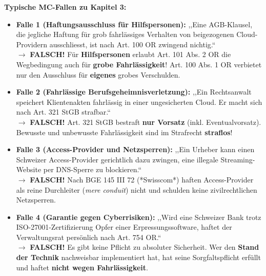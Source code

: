 \begin{important}
    \textbf{Typische MC-Fallen zu Kapitel 3:}
    \begin{itemize}
        \item \textbf{Falle 1 (Haftungsausschluss für Hilfspersonen):} ,,Eine AGB-Klausel, die jegliche Haftung für grob fahrlässiges Verhalten von beigezogenen Cloud-Providern ausschliesst, ist nach Art. 100 OR zwingend nichtig.`` \\
        $\rightarrow$ \textbf{FALSCH!} Für \textbf{Hilfspersonen} erlaubt Art. 101 Abs. 2 OR die Wegbedingung auch für \textbf{grobe Fahrlässigkeit}! Art. 100 Abs. 1 OR verbietet nur den Ausschluss für \textbf{eigenes} grobes Verschulden.
        \item \textbf{Falle 2 (Fahrlässige Berufsgeheimnisverletzung):} ,,Ein Rechtsanwalt speichert Klientenakten fahrlässig in einer ungesicherten Cloud. Er macht sich nach Art. 321 StGB strafbar.`` \\
        $\rightarrow$ \textbf{FALSCH!} Art. 321 StGB bestraft \textbf{nur Vorsatz} (inkl. Eventualvorsatz). Bewusste und unbewusste Fahrlässigkeit sind im Strafrecht \textbf{straflos}!
        \item \textbf{Falle 3 (Access-Provider und Netzsperren):} ,,Ein Urheber kann einen Schweizer Access-Provider gerichtlich dazu zwingen, eine illegale Streaming-Website per DNS-Sperre zu blockieren.`` \\
        $\rightarrow$ \textbf{FALSCH!} Nach BGE 145 III 72 (*Swisscom*) haften Access-Provider als reine Durchleiter (\textit{mere conduit}) nicht und schulden keine zivilrechtlichen Netzsperren.
        \item \textbf{Falle 4 (Garantie gegen Cyberrisiken):} ,,Wird eine Schweizer Bank trotz ISO-27001-Zertifizierung Opfer einer Erpressungssoftware, haftet der Verwaltungsrat persönlich nach Art. 754 OR.`` \\
        $\rightarrow$ \textbf{FALSCH!} Es gibt keine Pflicht zu absoluter Sicherheit. Wer den \textbf{Stand der Technik} nachweisbar implementiert hat, hat seine Sorgfaltspflicht erfüllt und haftet \textbf{nicht wegen Fahrlässigkeit}.
    \end{itemize}
\end{important}